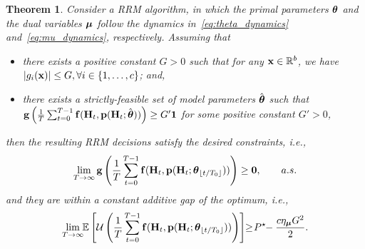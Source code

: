 \documentclass[lettersize,journal]{IEEEtran}
\newtheorem{theorem}{\hspace{0pt}\bf Theorem}
\def\E{\mathbb{E}}
\begin{document}
\begin{theorem}\label{thm:main}
\allowdisplaybreaks
Consider a RRM algorithm, in which the primal parameters $\boldsymbol{\theta}$ and the dual variables $\boldsymbol{\mu}$ follow the dynamics in~\eqref{eq:theta_dynamics} and~\eqref{eq:mu_dynamics}, respectively. Assuming that
\begin{itemize}
\item there exists a positive constant $G>0$ such that for any ${\mathbf x} \in {\mathbb R}^b$, we have $|g_i({\mathbf x})| \leq G, \forall i\in\{1,\dots,c\}$; and,
\item there exists a strictly-feasible set of model parameters  $\hat{\boldsymbol{\theta}}$ such that ${\mathbf g}\left( \frac{1}{T} \sum_{t=0}^{T-1} {\mathbf f}({\mathbf H}_t, {\mathbf p}({\mathbf H}_t;\hat{\boldsymbol{\theta}})) \right) \geq G'{\mathbf 1}$ for some positive constant $G'>0$,
\end{itemize}
then the resulting RRM decisions satisfy the desired constraints, i.e.,
\begin{align}\label{eq:thm_feasibility}
\lim_{T\to\infty}{\mathbf g}\left( \frac{1}{T} \sum_{t=0}^{T-1} {\mathbf f}({\mathbf H}_t, {\mathbf p}({\mathbf H}_t;\boldsymbol{\theta}_{\lfloor t/T_0 \rfloor})) \right) \geq {\ensuremath{\mathbf 0}}, \qquad a.s.
\end{align}
and they are within a constant additive gap of the optimum, i.e.,
\begin{align}
\lim_{T\to\infty} \hspace{-3pt} \E\left[ \mathcal{U}\left( \frac{1}{T} \sum_{t=0}^{T-1} \bbf(\bbH_t, \bbp(\bbH_t ;\bbtheta_{\lfloor t / T_0 \rfloor})) \right)\right]\hspace{-3pt} \geq\hspace{-2pt} P^{\star} \hspace{-3pt} - \frac{c\eta_{\bbmu}G^2}{2}.\label{eq:thm_optimality}
\end{align}






\end{theorem}
\end{document}

